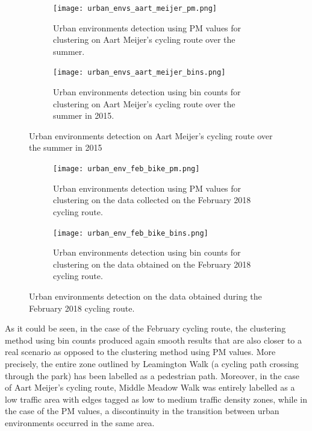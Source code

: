 \documentclass[bsc,frontabs,twoside,singlespacing, parskip,deptreport]{infthesis}     %
\begin{document}
\begin{figure}[h!]
  \begin{subfigure}[t]{0.5\textwidth}
    \texttt{[image: urban\_envs\_aart\_meijer\_pm.png]}
    \caption{Urban environments detection using PM values for clustering on Aart Meijer's cycling route over the summer.}
    \label{fig:meijer-bike-urban-envs-pm}
  \end{subfigure}
  \hfill
  \begin{subfigure}[t]{0.5\textwidth}
    \texttt{[image: urban\_envs\_aart\_meijer\_bins.png]}
    \caption{Urban environments detection using bin counts for clustering on Aart Meijer's cycling route over the summer in 2015.}
    \label{fig:meijer-bike-urban-envs-bins}
  \end{subfigure}
  \caption{Urban environments detection on Aart Meijer's cycling route over the summer in 2015}
  \label{fig:meijer-bike-urban-envs}
\end{figure}

\begin{figure}[h!]
  \begin{subfigure}[t]{\textwidth}
    \texttt{[image: urban\_env\_feb\_bike\_pm.png]}
    \caption{Urban environments detection using PM values for clustering on the data collected on the February 2018 cycling route.}
    \label{fig:feb-bike-urban-envs-pm}
  \end{subfigure}
  \hfill
  \begin{subfigure}[t]{\textwidth}
    \texttt{[image: urban\_env\_feb\_bike\_bins.png]}
    \caption{Urban environments detection using bin counts for clustering on the data obtained on the February 2018 cycling route.}
    \label{fig:feb-bike-urban-envs-bins}
  \end{subfigure}
  \caption{Urban environments detection on the data obtained during the February 2018 cycling route.}
  \label{fig:feb-bike-urban-envs}
\end{figure}

As it could be seen, in the case of the February cycling route, the clustering method using bin counts produced again smooth results that are also closer to a real scenario as opposed to the clustering method using PM values. More precisely, the entire zone outlined by Leamington Walk (a cycling path crossing through the park) has been labelled as a pedestrian path. Moreover, in the case of Aart Meijer's cycling route, Middle Meadow Walk was entirely labelled as a low traffic area with edges tagged as low to medium traffic density zones, while in the case of the PM values, a discontinuity in the transition between urban environments occurred in the same area.
\end{document}

